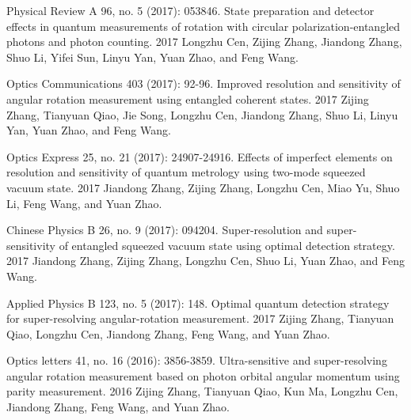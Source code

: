 \begin{cventries}

  \cventry
    {Physical Review A 96, no. 5 (2017): 053846.} %
    {State preparation and detector effects in quantum measurements of rotation with circular polarization-entangled photons and photon counting.} %
    {} %
    {2017} %
    {{\setmainfont{SourceSansPro-Bold}Longzhu Cen}, Zijing Zhang, Jiandong Zhang, Shuo Li, Yifei Sun, Linyu Yan, Yuan Zhao, and Feng Wang.}

  \cventry
    {Optics Communications 403 (2017): 92-96.}
    {Improved resolution and sensitivity of angular rotation measurement using entangled coherent states.}
    {} %
    {2017} %
    {Zijing Zhang, Tianyuan Qiao, Jie Song, {\setmainfont{SourceSansPro-Bold}Longzhu Cen}, Jiandong Zhang, Shuo Li, Linyu Yan, Yuan Zhao, and Feng Wang.}
    
  \cventry
    {Optics Express 25, no. 21 (2017): 24907-24916.}
    {Effects of imperfect elements on resolution and sensitivity of quantum metrology using two-mode squeezed vacuum state.}
    {} %
    {2017} %
    {Jiandong Zhang, Zijing Zhang, {\setmainfont{SourceSansPro-Bold}Longzhu Cen}, Miao Yu, Shuo Li, Feng Wang, and Yuan Zhao.}
    
  \cventry
    {Chinese Physics B 26, no. 9 (2017): 094204.}
    {Super-resolution and super-sensitivity of entangled squeezed vacuum state using optimal detection strategy.}
    {} %
    {2017} %
    {Jiandong Zhang, Zijing Zhang, {\setmainfont{SourceSansPro-Bold}Longzhu Cen}, Shuo Li, Yuan Zhao, and Feng Wang.}
    
  \cventry
    {Applied Physics B 123, no. 5 (2017): 148.}
    {Optimal quantum detection strategy for super-resolving angular-rotation measurement.}
    {} %
    {2017} %
    {Zijing Zhang, Tianyuan Qiao, {\setmainfont{SourceSansPro-Bold}Longzhu Cen}, Jiandong Zhang, Feng Wang, and Yuan Zhao.}
    
  \cventry
    {Optics letters 41, no. 16 (2016): 3856-3859.}
    {Ultra-sensitive and super-resolving angular rotation measurement based on photon orbital angular momentum using parity measurement.}
    {} %
    {2016} %
    {Zijing Zhang, Tianyuan Qiao, Kun Ma, {\setmainfont{SourceSansPro-Bold}Longzhu Cen}, Jiandong Zhang, Feng Wang, and Yuan Zhao.}
    

\end{cventries}
